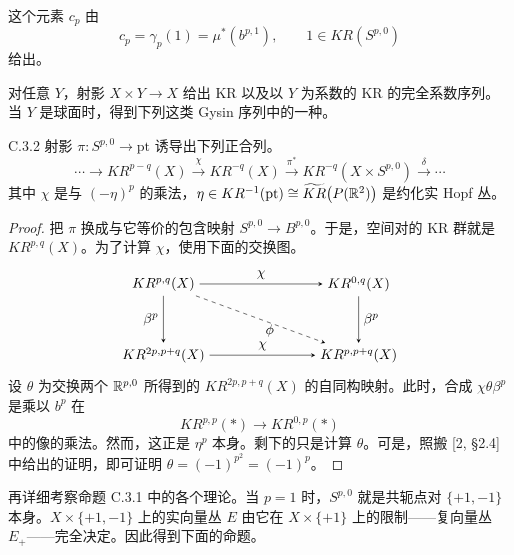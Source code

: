 这个元素 $c_p$ 由
\[
  c_p=\gamma_p(1)=\mu^*(b^{p,1}),\qquad 1\in KR(S^{p,0})
\]
给出。

对任意 $Y$，射影 $X\times Y\to X$ 给出 KR 以及以 $Y$ 为系数的 KR 的完全系数序列。当 $Y$ 是球面时，得到下列这类 Gysin 序列中的一种。

\begin{proposition*}{C.3.2}
  射影 $\pi\colon S^{p,0}\to \mathrm{pt}$ 诱导出下列正合列。
  \[
    \cdots\to KR^{p-q}(X)\xrightarrow{\chi} KR^{-q}(X)
    \xrightarrow{\pi^*} KR^{-q}(X\times S^{p,0})
    \xrightarrow{\delta}\cdots
  \]
  其中 $\chi$ 是与 $(-\eta)^p$ 的乘法，$\eta\in KR^{-1}(\mathrm{pt})\cong\widetilde{KR}\bigl(P(\mathbb{R}^2)\bigr)$ 是约化实 Hopf 丛。
\end{proposition*}

\begin{proof}
  把 $\pi$ 换成与它等价的包含映射 $S^{p,0}\to B^{p,0}$。于是，空间对的 KR 群就是 $KR^{p,q}(X)$。为了计算 $\chi$，使用下面的交换图。
  \[
  \begin{tikzpicture}[baseline=(current bounding box.center),>=stealth]
    \node (A) at (0,0) {$KR^{p,q}(X)$};
    \node (B) at (4.9,0) {$KR^{0,q}(X)$};
    \node (C) at (0,-1.8) {$KR^{2p,p+q}(X)$};
    \node (D) at (4.9,-1.8) {$KR^{p,p+q}(X)$};
    \draw[->] (A) -- node[above] {$\chi$} (B);
    \draw[->] (C) -- node[above] {$\chi$} (D);
    \draw[->] (A) -- node[left] {$\beta^p$} (C);
    \draw[->] (B) -- node[right] {$\beta^p$} (D);
    \draw[->,dashed] (A) -- node[below right] {$\phi$} (D);
  \end{tikzpicture}
  \]
  设 $\theta$ 为交换两个 $\mathbb{R}^{p,0}$ 所得到的 $KR^{2p,p+q}(X)$ 的自同构映射。此时，合成 $\chi\theta\beta^p$ 是乘以 $b^p$ 在
  \[
    KR^{p,p}(*)\to KR^{0,p}(*)
  \]
  中的像的乘法。然而，这正是 $\eta^p$ 本身。剩下的只是计算 $\theta$。可是，照搬 [2, §2.4] 中给出的证明，即可证明 $\theta=(-1)^{p^2}=(-1)^p$。
\end{proof}


再详细考察命题 C.3.1 中的各个理论。当 $p=1$ 时，$S^{p,0}$ 就是共轭点对 $\{+1,-1\}$ 本身。$X\times\{+1,-1\}$ 上的实向量丛 $E$ 由它在 $X\times\{+1\}$ 上的限制——复向量丛 $E_+$——完全决定。因此得到下面的命题。

